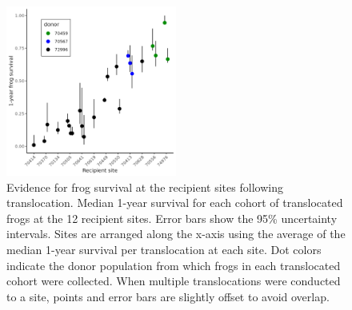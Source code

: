 \documentclass[9pt,twocolumn,twoside,lineno]{pnas-new}
\begin{document}
\begin{figure}

{\centering \includegraphics[width=0.5\textwidth]{figures/translocation_survival_bysiteid.png}

}

\caption{\label{fig-translocation-survival}Evidence for frog survival at
the recipient sites following translocation. Median 1-year survival for
each cohort of translocated frogs at the 12 recipient sites. Error bars
show the 95\% uncertainty intervals. Sites are arranged along the x-axis
using the average of the median 1-year survival per translocation at
each site. Dot colors indicate the donor population from which frogs in
each translocated cohort were collected. When multiple translocations
were conducted to a site, points and error bars are slightly offset to
avoid overlap.}

\end{figure}

\newpage
\end{document}
